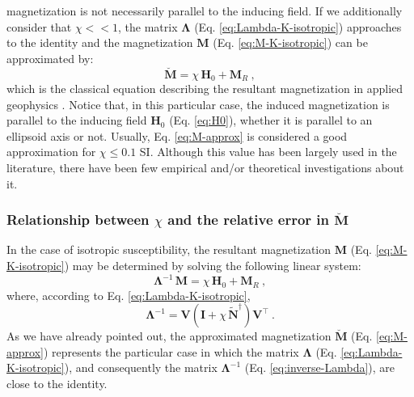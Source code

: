 \documentclass[gmd, manuscript]{copernicus}
\begin{document}
magnetization is not necessarily parallel to
the inducing field.
If we additionally consider that $\chi << 1$, the matrix
$\mathbf{\Lambda}$ (Eq. \ref{eq:Lambda-K-isotropic})
approaches to the identity and the magnetization
$\mathbf{M}$ (Eq. \ref{eq:M-K-isotropic})
can be approximated by:
\begin{equation}
\breve{\mathbf{M}} = \chi \, \mathbf{H}_{0} +
\mathbf{M}_{R} \: ,
\label{eq:M-approx}
\end{equation}
which is the classical equation describing the resultant
magnetization in applied geophysics \citep[p. ~89]{blakely1996}.
Notice that, in this particular case, the induced magnetization
is parallel to the inducing field $\mathbf{H}_{0}$ (Eq. \ref{eq:H0}),
whether it is parallel to an ellipsoid axis or not.
Usually, Eq. \ref{eq:M-approx}
is considered a good approximation for $\chi \leq 0.1$ \unit{SI}.
Although this value has been largely used in the literature,
there have been few empirical and/or theoretical investigations
about it.


\subsubsection{Relationship between $\chi$ and the relative error in $\breve{\mathbf{M}}$}


In the case of isotropic susceptibility, the resultant magnetization
$\mathbf{M}$ (Eq. \ref{eq:M-K-isotropic}) may be determined by solving the
following linear system:
\begin{equation}
\mathbf{\Lambda}^{-1} \, \mathbf{M} = \chi \, \mathbf{H}_{0} +
\mathbf{M}_{R} \: ,
\label{eq:M-K-isotropic-inverse-Lambda}
\end{equation}
where, according to Eq. \ref{eq:Lambda-K-isotropic},
\begin{equation}
\mathbf{\Lambda}^{-1} = \mathbf{V}
\left( \mathbf{I} + \chi \, \tilde{\mathbf{N}}^{\dagger} \right)
\mathbf{V}^{\top} \: .
\label{eq:inverse-Lambda}
\end{equation}
As we have already pointed out, the approximated
magnetization $\breve{\mathbf{M}}$ (Eq. \ref{eq:M-approx})
represents the particular case in which the matrix
$\mathbf{\Lambda}$ (Eq. \ref{eq:Lambda-K-isotropic}),
and consequently the matrix $\mathbf{\Lambda}^{-1}$
(Eq. \ref{eq:inverse-Lambda}), are close to the identity.
\end{document}
